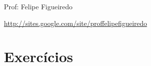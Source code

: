 \documentclass[a4paper]{article}
\begin{document}
\parbox[c]{.825\textwidth}{\raggedright%
{Prof: Felipe Figueiredo\par}
{\url{http://sites.google.com/site/proffelipefigueiredo}}

\vspace{1cm}
}



\section{Exercícios}
\end{document}
